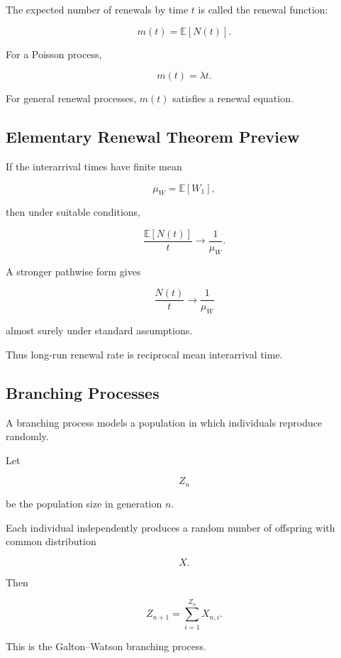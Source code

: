 The expected number of renewals by time \(t\) is called the renewal
function:

\[
\boxed{
m(t)
=
\mathbb{E}[N(t)].
}
\]

For a Poisson process,

\[
m(t)=\lambda t.
\]

For general renewal processes, \(m(t)\) satisfies a renewal equation.

\subsection{Elementary Renewal Theorem Preview}
\label{subsec:elementary-renewal-theorem-preview}

If the interarrival times have finite mean

\[
\mu_W
=
\mathbb{E}[W_1],
\]

then under suitable conditions,

\[
\boxed{
\frac{
\mathbb{E}[N(t)]
}{t}
\to
\frac1{\mu_W}.
}
\]

A stronger pathwise form gives

\[
\boxed{
\frac{N(t)}{t}
\to
\frac1{\mu_W}
}
\]

almost surely under standard assumptions.

Thus long-run renewal rate is reciprocal mean interarrival time.

\subsection{Branching Processes}
\label{subsec:branching-processes}

A branching process models a population in which individuals reproduce
randomly.

Let

\[
Z_n
\]

be the population size in generation \(n\).

Each individual independently produces a random number of offspring with
common distribution

\[
X.
\]

Then

\[
\boxed{
Z_{n+1}
=
\sum_{i=1}^{Z_n}
X_{n,i}.
}
\]

This is the Galton--Watson branching process.

